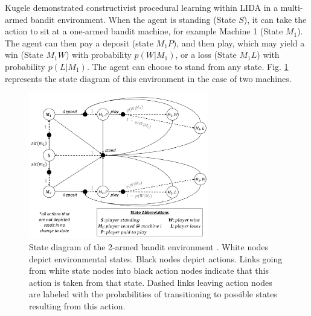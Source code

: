 \documentclass[runningheads]{llncs}
\begin{document}

Kugele \cite{kugele2025_constructivist} demonstrated constructivist procedural learning within LIDA in a multi-armed bandit environment.
When the agent is standing (State $S$), it can take the action to sit at a one-armed bandit machine, for example Machine 1 (State $M_1$).
The agent can then pay a deposit (state $M_1P$), and then play, which may yield a win (State $M_1W$) with probability $p(W|M_1)$, or a loss (State $M_1L$) with probability $p(L|M_1)$. The agent can choose to stand from any state.
Fig. \ref{fig:lida_bench} represents the state diagram of this environment in the case of two machines. 

\begin{figure}
	\centering
	\includegraphics[width=0.7\textwidth]{Figure_LIDA_bench.png}
	\caption{State diagram of the 2-armed bandit environment \cite[Fig. 5]{kugele2025_constructivist}.
	White nodes depict environmental states.
	Black nodes depict actions. 
	Links going from white state nodes into black action nodes indicate that this action is taken from that state. 
	Dashed links leaving action nodes are labeled with the probabilities of transitioning to possible states resulting from this action.} 
	\label{fig:lida_bench}
\end{figure}
\end{document}
